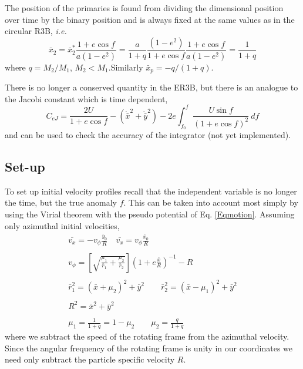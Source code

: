 \documentclass[usenatbib]{mn2e}
\def\xb{\bar{x}}
\def\yb{\bar{y}}
\begin{document}
The position of the primaries is found from dividing the dimensional
position over time by the binary position and is always fixed at the
same values as in the circular R3B, \textit{i.e.}
\begin{equation} \nonumber
\xb_2 = \xb^*_2 \frac{1+e \cos{f}}{a (1-e^2)} =   \frac{a}{1+q} \frac{(1-e^2)}{1+e \cos{f}}  \frac{1+e \cos{f}}{a (1-e^2)}  = \frac{1}{1+q}
\end{equation}
where $q = M_2/M_1$, $M_2 < M_1$.Similarly $\xb_p = -q/(1+q)$.

There is no longer a conserved quantity in the ER3B, but there is an
analogue to the Jacobi constant which is time dependent,
\begin{equation}
C_{eJ} = \frac{2 U}{1 + e \cos{f}} - \left( \dot{\xb}^2 + \dot{\yb}^2 \right) - 2 e \int^f_{f_0}{\frac{ U \sin{f} }{(1 + e \cos{f})^2 } \ df}
\end{equation}
and can be used to check the accuracy of the integrator (not yet
implemented).

\subsection{Set-up}
To set up initial velocity profiles recall that the independent
variable is no longer the time, but the true anomaly $f$. This can be
taken into account most simply by using the Virial theorem with the
pseudo potential of Eq. \ref{Eqmotion}. Assuming only azimuthal
initial velocities,
\begin{equation}
\begin{array}{c}
\bar{v_x} = -v_{\phi} \frac{\yb_0}{R} \quad \bar{v_x} = v_{\phi} \frac{\xb_0}{R} \\ \nonumber \\ \nonumber
v_{\phi} =   \left[ \sqrt{ \frac{\mu_1}{\bar{r}_1}  +  \frac{\mu_2}{\bar{r}_2} }  \right] \left( 1 + e \frac{\xb}{R} \right)^{-1}  - R\\ \nonumber \\ \nonumber
\bar{r}^2_1 =  (\xb + \mu_2)^2 + \yb^2  \qquad \bar{r}^2_2 =  (\xb - \mu_1)^2 + \yb^2  \\ \nonumber \\ \nonumber
R^2 = \xb^2 + \yb^2 \\ \nonumber \\ \nonumber
\mu_1 = \frac{1}{1+q} = 1-\mu_2  \qquad \mu_2 = \frac{q}{1+q}
\end{array}
\end{equation}
where we subtract the speed of the rotating frame from the azimuthal
velocity. Since the angular frequency of the rotating frame is unity
in our coordinates we need only subtract the particle specific
velocity $R$.
\end{document}
